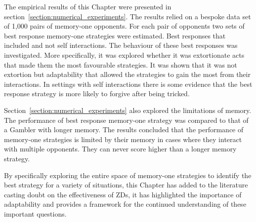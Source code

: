 The empirical results of this Chapter were presented in
section~\ref{section:numerical_experiments}. The results relied on a bespoke
data set of 1,000 pairs of memory-one opponents. For each pair of opponents two
sets of best response memory-one strategies were estimated. Best responses that
included and not self interactions. The behaviour of these best responses was
investigated. More specifically, it was explored whether it was extortionate
acts that made them the most favourable strategies. It was shown that it was not
extortion but adaptability that allowed the strategies to gain the most from
their interactions. In settings with self interactions there is some evidence
that the best response strategy is more likely to forgive after being tricked.

Section~\ref{section:numerical_experiments} also explored the limitations of
memory. The performance of best response memory-one strategy was compared to
that of a Gambler with longer memory. The results concluded that the
performance of memory-one strategies is limited by their memory in cases where
they interact with multiple opponents. They can never score higher than a
longer memory strategy.

By specifically exploring the entire space of memory-one strategies to identify
the best strategy for a variety of situations, this Chapter has added to the
literature casting doubt on the effectiveness of ZDs, it has highlighted the
importance of adaptability and provides a framework for the continued
understanding of these important questions.
